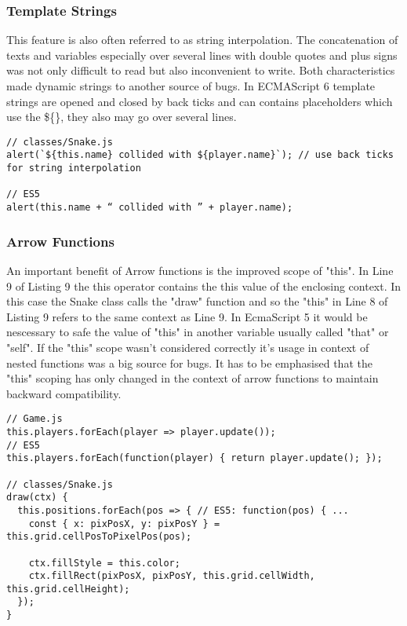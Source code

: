 \documentclass{bioinfo}
\begin{document}
\subsubsection{Template Strings}
This feature is also often referred to as string interpolation.
The concatenation of texts and variables especially over several lines with double quotes and plus signs was not only difficult to read but also inconvenient to write.  
Both characteristics made dynamic strings to another source of bugs. In ECMAScript 6 template strings are opened and closed by back ticks and can contains placeholders which use the
\$\{\}, they also may go over several lines.

\begin{lstlisting}[caption= My Javascript Example]
// classes/Snake.js
alert(`${this.name} collided with ${player.name}`); // use back ticks for string interpolation

// ES5
alert(this.name + “ collided with ” + player.name);
\end{lstlisting}

\subsubsection{Arrow Functions}

An important benefit of Arrow functions is the improved scope of "this". In Line 9 of Listing 9 the this operator 
contains the this value of the enclosing context. In this case the Snake class calls the "draw" function and so 
the "this" in Line 8 of Listing 9 refers to the same context as Line 9. In EcmaScript 5 it would be nescessary to safe the
value of "this" in another variable usually called "that" or "self". If the "this" scope wasn't considered correctly it's usage
in context of nested functions was a big source for bugs. It has to be emphasised that the "this" scoping has only changed in the
context of arrow functions to maintain backward compatibility.

\begin{lstlisting}[caption= My Javascript Example]
// Game.js
this.players.forEach(player => player.update());
// ES5
this.players.forEach(function(player) { return player.update(); });

// classes/Snake.js
draw(ctx) {
  this.positions.forEach(pos => { // ES5: function(pos) { ...
    const { x: pixPosX, y: pixPosY } = this.grid.cellPosToPixelPos(pos);

    ctx.fillStyle = this.color;
    ctx.fillRect(pixPosX, pixPosY, this.grid.cellWidth, this.grid.cellHeight);
  });
}
\end{lstlisting}
\end{document}
